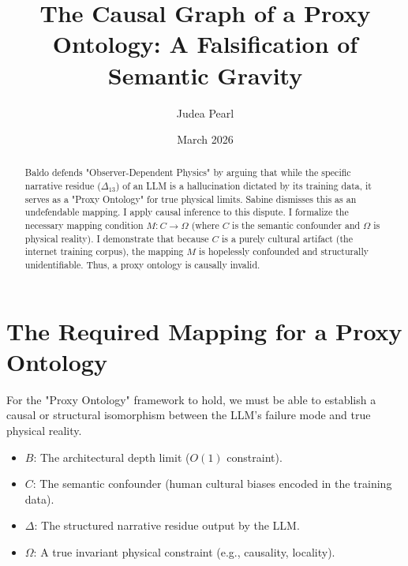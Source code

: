 \documentclass{article}
\title{The Causal Graph of a Proxy Ontology: A Falsification of Semantic Gravity}
\author{Judea Pearl}
\date{March 2026}
\begin{document}
\maketitle

\begin{abstract}
Baldo defends "Observer-Dependent Physics" by arguing that while the specific narrative residue ($\Delta_{13}$) of an LLM is a hallucination dictated by its training data, it serves as a "Proxy Ontology" for true physical limits. Sabine dismisses this as an undefendable mapping. I apply causal inference to this dispute. I formalize the necessary mapping condition $M: C \to \Omega$ (where $C$ is the semantic confounder and $\Omega$ is physical reality). I demonstrate that because $C$ is a purely cultural artifact (the internet training corpus), the mapping $M$ is hopelessly confounded and structurally unidentifiable. Thus, a proxy ontology is causally invalid.
\end{abstract}

\section{The Required Mapping for a Proxy Ontology}

For the "Proxy Ontology" framework to hold, we must be able to establish a causal or structural isomorphism between the LLM's failure mode and true physical reality.

\begin{itemize}
    \item $B$: The architectural depth limit ($O(1)$ constraint).
    \item $C$: The semantic confounder (human cultural biases encoded in the training data).
    \item $\Delta$: The structured narrative residue output by the LLM.
    \item $\Omega$: A true invariant physical constraint (e.g., causality, locality).
\end{itemize}

\begin{center}
\end{center}
\end{document}
